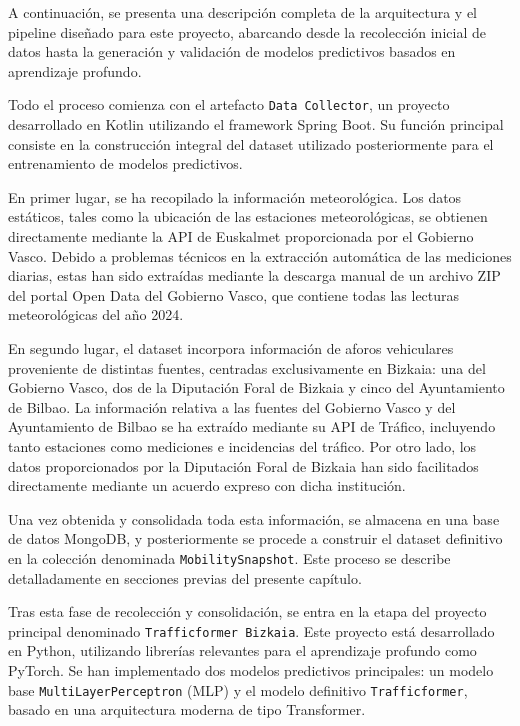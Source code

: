 A continuación, se presenta una descripción completa de la arquitectura y el pipeline diseñado para este proyecto, abarcando desde la recolección inicial de datos hasta la generación y validación de modelos predictivos basados en aprendizaje profundo.

Todo el proceso comienza con el artefacto \texttt{Data Collector}, un proyecto desarrollado en Kotlin utilizando el framework Spring Boot. Su función principal consiste en la construcción integral del dataset utilizado posteriormente para el entrenamiento de modelos predictivos.

En primer lugar, se ha recopilado la información meteorológica. Los datos estáticos, tales como la ubicación de las estaciones meteorológicas, se obtienen directamente mediante la API de Euskalmet proporcionada por el Gobierno Vasco. Debido a problemas técnicos en la extracción automática de las mediciones diarias, estas han sido extraídas mediante la descarga manual de un archivo ZIP del portal Open Data del Gobierno Vasco, que contiene todas las lecturas meteorológicas del año 2024.

En segundo lugar, el dataset incorpora información de aforos vehiculares proveniente de distintas fuentes, centradas exclusivamente en Bizkaia: una del Gobierno Vasco, dos de la Diputación Foral de Bizkaia y cinco del Ayuntamiento de Bilbao. La información relativa a las fuentes del Gobierno Vasco y del Ayuntamiento de Bilbao se ha extraído mediante su API de Tráfico, incluyendo tanto estaciones como mediciones e incidencias del tráfico. Por otro lado, los datos proporcionados por la Diputación Foral de Bizkaia han sido facilitados directamente mediante un acuerdo expreso con dicha institución.

Una vez obtenida y consolidada toda esta información, se almacena en una base de datos MongoDB, y posteriormente se procede a construir el dataset definitivo en la colección denominada \texttt{MobilitySnapshot}. Este proceso se describe detalladamente en secciones previas del presente capítulo.

Tras esta fase de recolección y consolidación, se entra en la etapa del proyecto principal denominado \texttt{Trafficformer Bizkaia}. Este proyecto está desarrollado en Python, utilizando librerías relevantes para el aprendizaje profundo como PyTorch. Se han implementado dos modelos predictivos principales: un modelo base \texttt{MultiLayerPerceptron} (MLP) y el modelo definitivo \texttt{Trafficformer}, basado en una arquitectura moderna de tipo Transformer.

